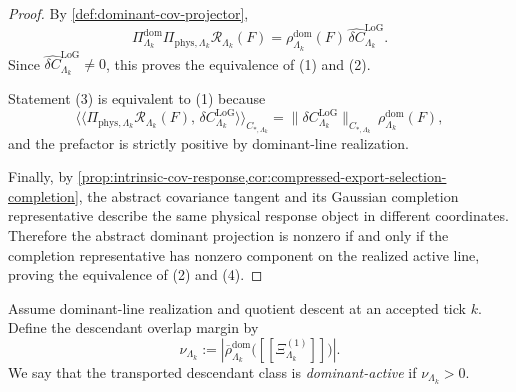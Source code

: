 \documentclass[11pt]{article}
\begin{document}
\begin{proof}
By \cref{def:dominant-cov-projector},
\[
\Pi^{\mathrm{dom}}_{\Lambda_k}\Pi_{\mathrm{phys},\Lambda_k}\mathcal R_{\Lambda_k}(F)
=
\rho^{\mathrm{dom}}_{\Lambda_k}(F)\,
\widehat{\delta C}^{\mathrm{LoG}}_{\Lambda_k}.
\]
Since \(\widehat{\delta C}^{\mathrm{LoG}}_{\Lambda_k}\neq 0\), this proves the equivalence of (1)
and (2).

Statement (3) is equivalent to (1) because
\[
\big\langle\!\big\langle
\Pi_{\mathrm{phys},\Lambda_k}\mathcal R_{\Lambda_k}(F),\,
\delta C^{\mathrm{LoG}}_{\Lambda_k}
\big\rangle\!\big\rangle_{C_{\ast,\Lambda_k}}
=
\|\delta C^{\mathrm{LoG}}_{\Lambda_k}\|_{C_{\ast,\Lambda_k}}\,
\rho^{\mathrm{dom}}_{\Lambda_k}(F),
\]
and the prefactor is strictly positive by dominant-line realization.

Finally, by \cref{prop:intrinsic-cov-response,cor:compressed-export-selection-completion}, the
abstract covariance tangent and its Gaussian completion representative describe the same physical
response object in different coordinates. Therefore the abstract dominant projection is nonzero if
and only if the completion representative has nonzero component on the realized active line,
proving the equivalence of (2) and (4).
\end{proof}

\begin{definition}
\label{def:descendant-overlap-margin}
Assume dominant-line realization and quotient descent at an accepted tick \(k\).
Define the descendant overlap margin by
\begin{equation}
\nu_{\Lambda_k}
:=
\left|
\overline{\rho}^{\mathrm{dom}}_{\Lambda_k}\big([\![\Xi^{(1)}_{\Lambda_k}]\!]\big)
\right|.
\label{eq:descendant-overlap-margin}
\end{equation}
We say that the transported descendant class is \emph{dominant-active} if
\(
\nu_{\Lambda_k}>0
\).
\end{definition}
\end{document}
